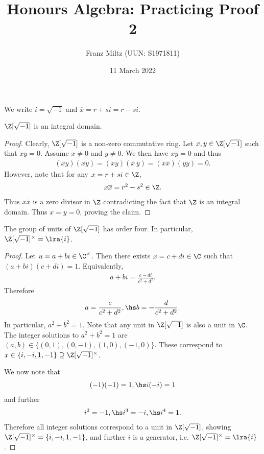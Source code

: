 \documentclass{article}
\begin{document}
\title{Honours Algebra: Practicing Proof 2}
\author{Franz Miltz (UUN: S1971811)}
\date{11 March 2022}
\maketitle
\newcommand{\gaussint}{\Z[\sqrt{-1}]}
We write $i=\sqrt{-1}$ and $\overline x = \overline{r+si} = r - si$.
\begin{claim*}[1]
   $\Z[\sqrt{-1}]$ is an integral domain.
   \begin{proof}
      Clearly, $\gaussint$ is a non-zero commutative ring. Let $x,y\in\gaussint$ such that 
      $xy=0$. Assume $x\not=0$ and $y\not=0$. We then have $\overline{xy}=0$ and thus 
      \begin{align*}
         (xy)(\overline{xy})=(xy)(\overline x\,\overline y)=(x\overline x)(y\overline y) = 0.
      \end{align*}
      However, note that for any $x=r+si\in\Z$, 
      \begin{align*}
         x\overline x = r^2-s^2 \in\Z.
      \end{align*}
      Thus $x\overline x$ is a zero divisor in $\Z$ contradicting the fact that $\Z$ is an 
      integral domain. Thus $x=y=0$, proving the claim.
   \end{proof}
\end{claim*}

\begin{claim*}[2]
   The group of units of $\gaussint$ has order four. In particular, $\gaussint^\times = \lra{i}$.
   \begin{proof}
      Let $u=a+bi\in\C^\times$. Then there exists $x=c+di\in\C$ such that $(a+bi)(c+di) = 1$.
      Equivalently,
      \begin{align*}
         a+bi = \frac{c-di}{c^2+d^2}.
      \end{align*}
      Therefore 
      \begin{align*}
         a = \frac{c}{c^2+d^2},\hs b=-\frac{d}{c^2+d^2}.
      \end{align*}
      In particular, $a^2+b^2=1$. Note that any unit in $\gaussint$ is also a unit in $\C$. 
      The integer solutions to $a^2+b^2=1$ are $(a,b)\in\{(0,1),(0,-1),(1,0),(-1,0)\}$.
      These correspond to $x\in\{i,-i,1,-1\}\supseteq\gaussint^\times$.

      We now note that 
      \begin{align*}
         (-1)(-1) = 1,\hs i(-i) = 1
      \end{align*}
      and further
      \begin{align*}
         i^2 = -1,\hs i^3 = -i, \hs i^4 = 1.
      \end{align*}
      Therefore all integer solutions correspond to a unit in $\gaussint$, showing 
      $\gaussint^\times=\{i,-i,1,-1\}$, and further $i$ is a generator, i.e. $\gaussint^\times=\lra{i}$.
   \end{proof}
\end{claim*}
\end{document}
